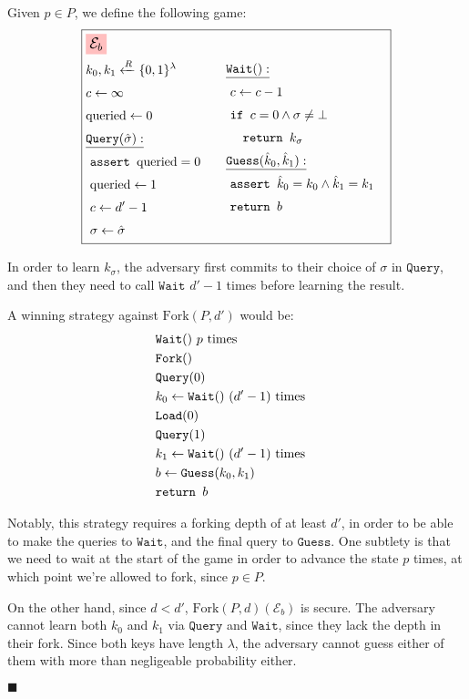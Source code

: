 Given $p \in P$, we define the following game:
$$
\boxed{
\begin{aligned}
&\colorbox{pink}{\large $\mathcal{E}_b$}\cr
&\begin{aligned}
    &k_0, k_1 \xleftarrow{R} \{0, 1\}^\lambda\cr
    &c \gets \infty\cr
    &\text{queried} \gets 0\cr
    &\underline{\texttt{Query}(\hat{\sigma}):}\cr
    &\ \texttt{assert } \text{queried} = 0\cr
    &\ \text{queried} \gets 1\cr
    &\ c \gets d' - 1\cr
    &\ \sigma \gets \hat{\sigma}
\end{aligned}
&\begin{aligned}
    &\underline{\texttt{Wait}():}\cr
    &\ c \gets c - 1\cr
    &\ \texttt{if } c = 0 \land \sigma \neq \bot\cr
    &\ \quad \texttt{return } k_\sigma\cr
    &\underline{\texttt{Guess}(\hat{k}_0, \hat{k}_1):}\cr
    &\ \texttt{assert } \hat{k}_0 = k_0 \land \hat{k}_1 = k_1\cr
    &\ \texttt{return } b\cr
    &\cr
\end{aligned}\cr
\end{aligned}
}
$$

In order to learn $k_\sigma$, the adversary first commits to their choice
of $\sigma$ in $\texttt{Query}$, and then they need to call $\texttt{Wait}$
$d' - 1$
times before learning the result.

A winning strategy against $\text{Fork}(P, d')$ would be:
$$
\begin{aligned}
&\texttt{Wait}()\ p \text{ times}\cr
&\texttt{Fork}()\cr
&\texttt{Query}(0)\cr
&k_0 \gets \texttt{Wait}()\ (d' - 1) \text{ times}\cr
&\texttt{Load}(0)\cr
&\texttt{Query}(1)\cr
&k_1 \gets \texttt{Wait}()\ (d' - 1) \text{ times}\cr
&b \gets \texttt{Guess}(k_0, k_1)\cr
&\texttt{return } b\cr
\end{aligned}
$$

Notably, this strategy requires a forking depth of at least $d'$,
in order to be able to make the queries to $\texttt{Wait}$,
and the final query to $\texttt{Guess}$.
One subtlety is that we need to wait at the start of the game in order
to advance the state $p$ times, at which point we're allowed to fork,
since $p \in P$.

On the other hand, since $d < d'$, $\text{Fork}(P, d)(\mathcal{E}_b)$
is secure.
The adversary cannot learn both $k_0$ and $k_1$ via $\texttt{Query}$
and $\texttt{Wait}$, since they lack the depth in their fork.
Since both keys have length $\lambda$, the adversary cannot guess
either of them with more than negligeable probability either.


$\blacksquare$


